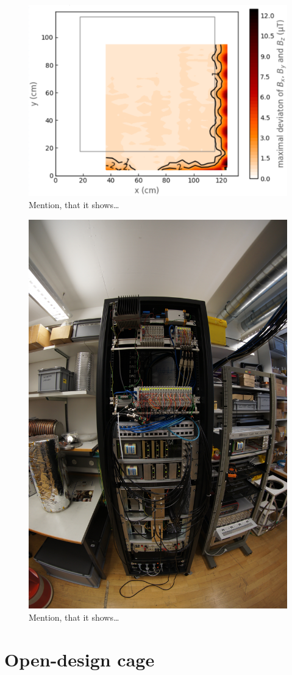 \begin{figure}
  \centering
  \includegraphics[width=0.9\linewidth]{gfx/prototype/plane_map.png}
  \caption{Mention, that it shows\ldots}
  \label{fig:prototype_plane_map}
\end{figure}


\begin{figure}
  \centering
  \includegraphics[width=0.6\linewidth,angle=90]{gfx/prototype/DSC03477.JPG}
  \caption{Mention, that it shows\ldots}
  \label{fig:prototype_photo_daq}
\end{figure}






\section{Open-design cage}

